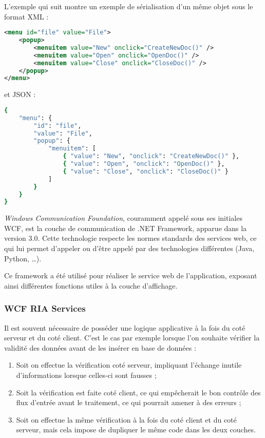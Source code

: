 L'exemple qui suit montre un exemple de sérialisation d'un même objet sous le format XML :
\begin{lstlisting}[language = xml]
<menu id="file" value="File">
	<popup>
		<menuitem value="New" onclick="CreateNewDoc()" />
		<menuitem value="Open" onclick="OpenDoc()" />
		<menuitem value="Close" onclick="CloseDoc()" />
	</popup>
</menu>
\end{lstlisting}
et JSON :
\begin{lstlisting}[language = sh]
{
	"menu": {
		"id": "file",
		"value": "File",
		"popup": {
			"menuitem": [
				{ "value": "New", "onclick": "CreateNewDoc()" },
				{ "value": "Open", "onclick": "OpenDoc()" },
				{ "value": "Close", "onclick": "CloseDoc()" }
			]
		}
	}
}
\end{lstlisting}



\textit{Windows Communication Foundation}, couramment appelé sous ses initiales WCF, est la couche de communication de .NET Framework, apparue dans la version 3.0. Cette technologie respecte les normes standards des services web, ce qui lui permet d'appeler ou d'être appelé par des technologies différentes (Java, Python, \ldots).

Ce framework a été utilisé pour réaliser le service web de l'application, exposant ainsi différentes fonctions utiles à la couche d'affichage.


\subsubsection{WCF RIA Services}

Il est souvent nécessaire de posséder une logique applicative à la fois du coté serveur et du coté client. C'est le cas par exemple lorsque l'on souhaite vérifier la validité des données avant de les insérer en base de données :
\begin{enumerate}
	\item Soit on effectue la vérification coté serveur, impliquant l'échange inutile d'informations lorsque celles-ci sont fausses ;
	\item Soit la vérification est faite coté client, ce qui empêcherait le bon contrôle des flux d'entrée avant le traitement, ce qui pourrait amener à des erreurs ;
	\item Soit on effectue la même vérification à la fois du coté client et du coté serveur, mais cela impose de dupliquer le même code dans les deux couches.
\end{enumerate}
~~\\


